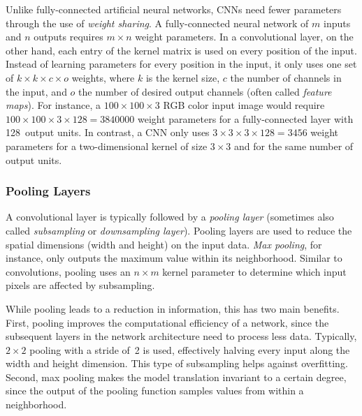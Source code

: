 Unlike fully-connected artificial neural networks, CNNs need fewer parameters through the use of \emph{weight sharing}. A fully-connected neural network of $m$ inputs and $n$ outputs requires $m \times n$ weight parameters. In a convolutional layer, on the other hand, each entry of the kernel matrix is used on every position of the input. Instead of learning parameters for every position in the input, it only uses one set of $k \times k \times c \times o$ weights, where $k$ is the kernel size, $c$ the number of channels in the input, and $o$ the number of desired output channels (often called \emph{feature maps}). For instance, a $100 \times 100 \times 3$ RGB color input image would require $100 \times 100 \times 3 \times 128 = \num{3840000}$ weight parameters for a fully-connected layer with \num{128}~output units. In contrast, a CNN only uses $3 \times 3 \times 3 \times 128 = \num{3456}$ weight parameters for a two-dimensional kernel of size $3 \times 3$ and for the same number of output units.


\subsubsection{Pooling Layers}
A convolutional layer is typically followed by a \emph{pooling layer} (sometimes also called \emph{subsampling} or \emph{downsampling layer}). Pooling layers are used to reduce the spatial dimensions (width and height) on the input data. \emph{Max pooling}, for instance, only outputs the maximum value within its neighborhood. Similar to convolutions, pooling uses an $n \times m$ kernel parameter to determine which input pixels are affected by subsampling.

	While pooling leads to a reduction in information, this has two main benefits. First, pooling improves the computational efficiency of a network, since the subsequent layers in the network architecture need to process less data. Typically, $2 \times 2$ pooling with a stride of~\num{2} is used, effectively halving every input along the width and height dimension. This type of subsampling helps against overfitting.
	Second, max pooling makes the model translation invariant to a certain degree, since the output of the pooling function samples values from within a neighborhood.
	
